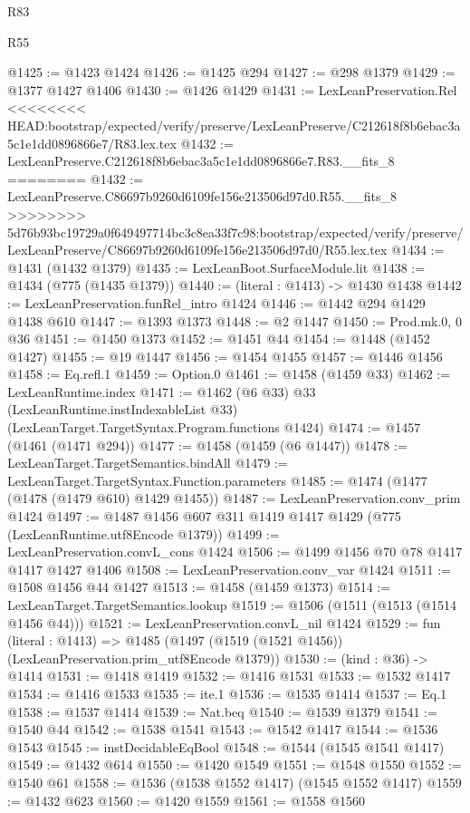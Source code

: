 \begin{lexlean}{R83}
\begin{lexlean}{R55}
\begin{coremodule}
{{{{{{{{{{{{{{{{{{{{{{{{{{{{{{{{{{{{{{{{{{{{{{{{{{{{{{{{{{{{{{@1425 := @1423 @1424
@1426 := @1425 @294
@1427 := @298 @1379
@1429 := @1377 @1427 @1406
@1430 := @1426 @1429
@1431 := LexLeanPreservation.Rel
<<<<<<<< HEAD:bootstrap/expected/verify/preserve/LexLeanPreserve/C212618f8b6ebac3a5c1e1dd0896866e7/R83.lex.tex
@1432 := LexLeanPreserve.C212618f8b6ebac3a5c1e1dd0896866e7.R83.__fits_8
========
@1432 := LexLeanPreserve.C86697b9260d6109fe156e213506d97d0.R55.__fits_8
>>>>>>>> 5d76b93bc19729a0f649497714bc3c8ea33f7c98:bootstrap/expected/verify/preserve/LexLeanPreserve/C86697b9260d6109fe156e213506d97d0/R55.lex.tex
@1434 := @1431 (@1432 @1379)
@1435 := LexLeanBoot.SurfaceModule.lit
@1438 := @1434 (@775 (@1435 @1379))
@1440 := (literal : @1413) -> @1430 @1438
@1442 := LexLeanPreservation.funRel_intro @1424
@1446 := @1442 @294 @1429 @1438 @610
@1447 := @1393 @1373
@1448 := @2 @1447
@1450 := Prod.mk.{0, 0} @36
@1451 := @1450 @1373
@1452 := @1451 @44
@1454 := @1448 (@1452 @1427)
@1455 := @19 @1447
@1456 := @1454 @1455
@1457 := @1446 @1456
@1458 := Eq.refl.{1}
@1459 := Option.{0}
@1461 := @1458 (@1459 @33)
@1462 := LexLeanRuntime.index
@1471 := @1462
    (@6 @33)
    @33
    (LexLeanRuntime.instIndexableList @33)
    (LexLeanTarget.TargetSyntax.Program.functions @1424)
@1474 := @1457 (@1461 (@1471 @294))
@1477 := @1458 (@1459 (@6 @1447))
@1478 := LexLeanTarget.TargetSemantics.bindAll
@1479 := LexLeanTarget.TargetSyntax.Function.parameters
@1485 := @1474 (@1477 (@1478 (@1479 @610) @1429 @1455))
@1487 := LexLeanPreservation.conv_prim @1424
@1497 := @1487 @1456 @607 @311 @1419 @1417 @1429 (@775 (LexLeanRuntime.utf8Encode @1379))
@1499 := LexLeanPreservation.convL_cons @1424
@1506 := @1499 @1456 @70 @78 @1417 @1417 @1427 @1406
@1508 := LexLeanPreservation.conv_var @1424
@1511 := @1508 @1456 @44 @1427
@1513 := @1458 (@1459 @1373)
@1514 := LexLeanTarget.TargetSemantics.lookup
@1519 := @1506 (@1511 (@1513 (@1514 @1456 @44)))
@1521 := LexLeanPreservation.convL_nil @1424
@1529 := fun (literal : @1413) =>
  @1485 (@1497 (@1519 (@1521 @1456)) (LexLeanPreservation.prim_utf8Encode @1379))
@1530 := (kind : @36) -> @1414
@1531 := @1418 @1419
@1532 := @1416 @1531
@1533 := @1532 @1417
@1534 := @1416 @1533
@1535 := ite.{1}
@1536 := @1535 @1414
@1537 := Eq.{1}
@1538 := @1537 @1414
@1539 := Nat.beq
@1540 := @1539 @1379
@1541 := @1540 @44
@1542 := @1538 @1541
@1543 := @1542 @1417
@1544 := @1536 @1543
@1545 := instDecidableEqBool
@1548 := @1544 (@1545 @1541 @1417)
@1549 := @1432 @614
@1550 := @1420 @1549
@1551 := @1548 @1550
@1552 := @1540 @61
@1558 := @1536 (@1538 @1552 @1417) (@1545 @1552 @1417)
@1559 := @1432 @623
@1560 := @1420 @1559
@1561 := @1558 @1560
}}}}}}}}}}}}}}}}}}}}}}}}}}}}}}}}}}}}}}}}}}}}}}}}}}}}}}}}}}}}}}
\end{coremodule}
\end{lexlean}
\end{lexlean}
